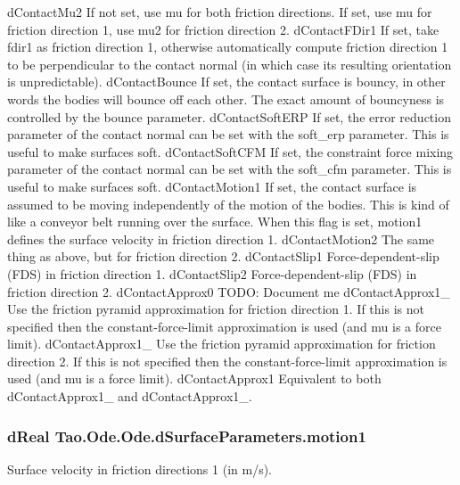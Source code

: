 dContactMu2 If not set, use mu for both friction directions. If set, use mu for friction direction 1, use mu2 for friction direction 2. dContactFDir1 If set, take fdir1 as friction direction 1, otherwise automatically compute friction direction 1 to be perpendicular to the contact normal (in which case its resulting orientation is unpredictable). dContactBounce If set, the contact surface is bouncy, in other words the bodies will bounce off each other. The exact amount of bouncyness is controlled by the bounce parameter. dContactSoftERP If set, the error reduction parameter of the contact normal can be set with the soft\_\-erp parameter. This is useful to make surfaces soft. dContactSoftCFM If set, the constraint force mixing parameter of the contact normal can be set with the soft\_\-cfm parameter. This is useful to make surfaces soft. dContactMotion1 If set, the contact surface is assumed to be moving independently of the motion of the bodies. This is kind of like a conveyor belt running over the surface. When this flag is set, motion1 defines the surface velocity in friction direction 1. dContactMotion2 The same thing as above, but for friction direction 2. dContactSlip1 Force-\/dependent-\/slip (FDS) in friction direction 1. dContactSlip2 Force-\/dependent-\/slip (FDS) in friction direction 2. dContactApprox0 TODO: Document me dContactApprox1\_ Use the friction pyramid approximation for friction direction 1. If this is not specified then the constant-\/force-\/limit approximation is used (and mu is a force limit). dContactApprox1\_ Use the friction pyramid approximation for friction direction 2. If this is not specified then the constant-\/force-\/limit approximation is used (and mu is a force limit). dContactApprox1 Equivalent to both dContactApprox1\_ and dContactApprox1\_. \hypertarget{struct_tao_1_1_ode_1_1_ode_1_1d_surface_parameters_a9c1e4fb56115f862e4b74f04ecbdf73d}{
\subsubsection[{motion1}]{\setlength{\rightskip}{0pt plus 5cm}dReal {\bf Tao.Ode.Ode.dSurfaceParameters.motion1}}}
\label{struct_tao_1_1_ode_1_1_ode_1_1d_surface_parameters_a9c1e4fb56115f862e4b74f04ecbdf73d}


Surface velocity in friction directions 1 (in m/s). 

